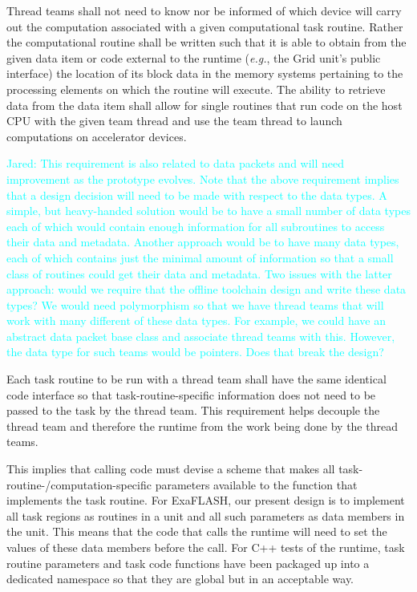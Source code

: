 \documentclass{article}
\newcommand{\FlashOfTheFuture}{ExaFLASH\xspace}
\newcommand{\eg}{\textit{e.g.}}   %
\newcommand{\Jared}[1]          {\textcolor{cyan}{Jared: #1}}
\newcommand{\taskroutine}        {task routine\xspace}
\begin{document}
\begin{req}
\label{req:ThreadTeamEncapsulation}
Thread teams shall not need to know nor be informed of which device will carry
out the computation associated with a given computational \taskroutine.  Rather
the computational routine shall be written such that it is able to obtain from
the given data item or code external to the runtime (\eg, the Grid unit's public
interface) the location of its block data in the memory systems pertaining to
the processing elements on which the routine will execute.  The ability to
retrieve data from the data item shall allow for single routines that run code
on the host CPU with the given team thread and use the team thread to launch
computations on accelerator devices.
\end{req}

\Jared{This requirement is also related to
data packets and will need improvement as the prototype evolves.
Note that the above requirement implies that a design decision will need to be
made with respect to the data types.  A simple, but heavy-handed solution would
be to have a small number of data types each of which would contain enough
information for all subroutines to access their data and metadata.  Another
approach would be to have many data types, each of which contains just the
minimal amount of information so that a small class of routines could get their
data and metadata.  Two issues with the latter approach: would we require that
the offline toolchain design and write these data types?  We would need
polymorphism so that we have thread teams that will work with many different of
these data types.  For example, we could have an abstract data packet base class
and associate thread teams with this.  However, the data type for such teams
would be pointers.  Does that break the design?}

\begin{req}
Each \taskroutine to be run with a thread team shall have the same identical code
interface so that task-routine-specific information does not need to be passed to the
task by the thread team.  This requirement helps decouple the thread team and
therefore the runtime from the work being done by the thread teams.
\end{req}

This implies that calling code must devise a scheme that makes all
task-routine-/computation-specific parameters available to the function that implements the
\taskroutine.  For \FlashOfTheFuture, our present design is to implement all task regions as
routines in a unit and all such parameters as data members in the unit.  This
means that the code that calls the runtime will need to set the values of these
data members before the call.  For C++ tests of the runtime, \taskroutine parameters
and task code functions have been packaged up into a dedicated namespace so that they
are global but in an acceptable way.
\end{document}
